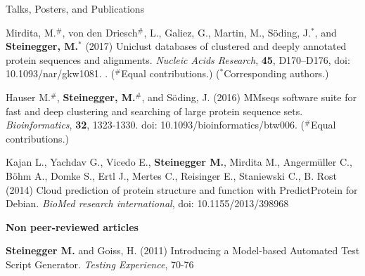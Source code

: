 \documentclass{resume} %
\begin{document}
\begin{rSection}{Talks, Posters, and Publications}
\begin{thebibliography}{10}
Mirdita, M.$^\#$, von den Driesch$^\#$, L., Galiez, G., Martin, M., S\"oding, J.$^*$, and {\bf Steinegger, M.}$^*$ (2017)
Uniclust databases of clustered and deeply annotated protein sequences and alignments.  
{\em Nucleic Acids Research}, {\bf 45}, D170–D176, doi: 10.1093/nar/gkw1081. . ($^\#$Equal contributions.) ($^*$Corresponding authors.)

Hauser M.$^\#$, {\bf Steinegger, M.}$^\#$, and S\"oding, J. (2016)
MMseqs software suite for fast and deep clustering and searching of large protein sequence sets.
{\em Bioinformatics}, {\bf 32}, 1323-1330. doi: 10.1093/bioinformatics/btw006. ($^\#$Equal contributions.)

Kajan L., Yachdav G., Vicedo E., {\bf Steinegger M.}, Mirdita M., Angerm\"uller C., B\"ohm A., Domke S., Ertl J., Mertes C., Reisinger E., Staniewski C., B. Rost (2014)
Cloud prediction of protein structure and function with PredictProtein for Debian.
  {\em BioMed research international}, doi: 10.1155/2013/398968
\end{thebibliography}

{\bf Non peer-reviewed articles}\\[-17mm]
\begin{thebibliography}{10}
{\bf Steinegger M.} and Goiss, H. (2011)
Introducing a Model-based Automated Test Script Generator.
{\em Testing Experience}, 70-76
\end{thebibliography}
\end{rSection}
\clearpage
\end{document}
